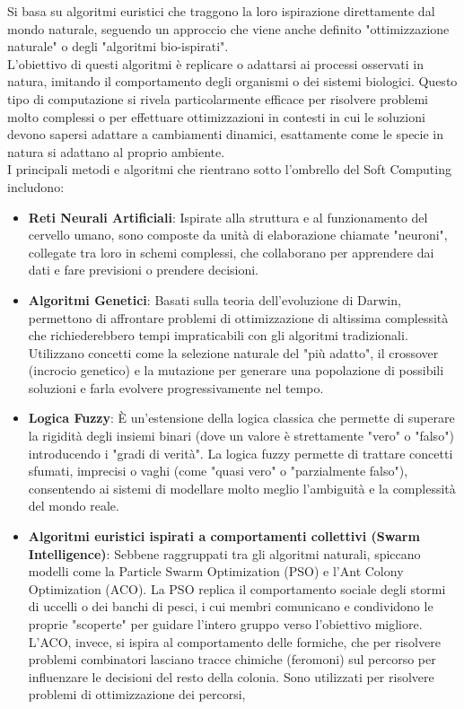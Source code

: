 Si basa su algoritmi euristici che traggono la loro ispirazione direttamente dal mondo 
naturale, seguendo un approccio che viene anche definito "ottimizzazione naturale" o 
degli "algoritmi bio-ispirati".\\

L'obiettivo di questi algoritmi è replicare o adattarsi ai processi osservati in 
natura, imitando il comportamento degli organismi o dei sistemi biologici. 
Questo tipo di computazione si rivela particolarmente efficace per risolvere problemi 
molto complessi o per effettuare ottimizzazioni in contesti in cui le soluzioni devono
sapersi adattare a cambiamenti dinamici, esattamente come le specie in natura si 
adattano al proprio ambiente.\\

I principali metodi e algoritmi che rientrano sotto l'ombrello del Soft Computing includono:

\begin{itemize}
    \item \textbf{Reti Neurali Artificiali}: Ispirate alla struttura e al funzionamento del cervello umano,
    sono composte da unità di elaborazione chiamate "neuroni", collegate tra
    loro in schemi complessi, che collaborano per apprendere dai dati e fare 
    previsioni o prendere decisioni.
    \item \textbf{Algoritmi Genetici}: Basati sulla teoria dell'evoluzione di Darwin, permettono 
    di affrontare problemi di ottimizzazione di altissima complessità che 
    richiederebbero tempi impraticabili con gli algoritmi tradizionali.
    Utilizzano concetti come la selezione naturale del "più adatto", il 
    crossover (incrocio genetico) e la mutazione per generare una popolazione di 
    possibili soluzioni e farla evolvere progressivamente nel tempo.
    \item \textbf{Logica Fuzzy}: È un'estensione della logica classica che permette 
    di superare la rigidità degli insiemi binari (dove un valore è strettamente "vero" 
    o "falso") introducendo i "gradi di verità".
    La logica fuzzy permette di trattare concetti sfumati, imprecisi o vaghi (come
    "quasi vero" o "parzialmente falso"), consentendo ai sistemi di modellare molto meglio 
    l'ambiguità e la complessità del mondo reale.
    \item \textbf{Algoritmi euristici ispirati a comportamenti collettivi (Swarm Intelligence)}: 
    Sebbene raggruppati tra gli algoritmi naturali, spiccano modelli come la Particle 
    Swarm Optimization (PSO) e l'Ant Colony Optimization (ACO).
    La PSO replica il comportamento sociale degli stormi di uccelli o dei banchi 
    di pesci, i cui membri comunicano e condividono le proprie "scoperte" per guidare 
    l'intero gruppo verso l'obiettivo migliore. L'ACO, invece, si ispira al 
    comportamento delle formiche, che per risolvere problemi combinatori lasciano 
    tracce chimiche (feromoni) sul percorso per influenzare le decisioni del resto 
    della colonia. Sono utilizzati per risolvere problemi di ottimizzazione dei percorsi,
\end{itemize}

